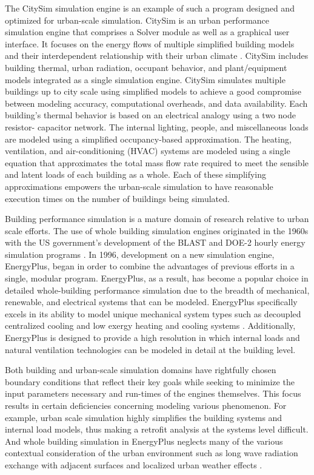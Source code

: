 \documentclass{tBPS2e}
\theoremstyle{plain}
\theoremstyle{definition}
\theoremstyle{remark}
\newcommand{\noteDT}[1]{\footnote{\textcolor{green}{#1}}}
\begin{document}
The CitySim simulation engine is an example of such a program designed and
optimized for urban-scale simulation. CitySim is an urban performance
simulation engine that comprises a Solver module as well as a graphical user
interface. It focuses on the energy flows of multiple simplified building
models and their interdependent relationship with their urban climate
\citep{Robinson:2009tm}. CitySim includes building thermal, urban radiation,
occupant behavior, and plant/equipment models integrated as a single
simulation engine. CitySim simulates multiple buildings up to city scale using
simplified models to achieve a good compromise between modeling
accuracy, computational overheads, and data availability. Each building's
thermal behavior is based on an electrical analogy using a two node resistor-
capacitor network. The internal lighting, people, and miscellaneous loads are
modeled using a simplified occupancy-based approximation. The heating,
ventilation, and air-conditioning (HVAC) systems are modeled using a single
equation that approximates the total mass flow rate required to meet the
sensible and latent loads of each building as a whole. Each of these
simplifying approximations empowers the urban-scale simulation to have
reasonable execution times on the number of buildings being
simulated.

Building performance simulation is a mature domain of research relative to
urban scale efforts. The use of whole building simulation engines originated
in the 1960s with the US government's development of the BLAST and DOE-2
hourly energy simulation programs \citep{Lawrie:2001vf}. In 1996, development
on a new simulation engine, EnergyPlus, began in order to combine the
advantages of previous efforts in a single, modular program. EnergyPlus, as a
result, has become a popular choice in detailed whole-building performance
simulation due to the breadth of mechanical, renewable, and electrical systems
that can be modeled. EnergyPlus specifically excels in its ability to model
unique mechanical system types such as decoupled centralized cooling
\citep{Miller:2010wa} and low exergy heating and cooling systems
\citep{barbara:2015tz}. Additionally, EnergyPlus is designed to provide a high
resolution in which internal loads and natural ventilation technologies can be
modeled in detail at the building level.

Both building and urban-scale simulation domains have rightfully chosen
boundary conditions that reflect their key goals while seeking to minimize the
input parameters necessary and run-times of the engines themselves. This focus
results in certain deficiencies concerning modeling various phenomenon.
For example, urban scale simulation highly simplifies the building systems and
internal load models, thus making a retrofit analysis at the systems level
difficult. And whole building simulation in EnergyPlus neglects many of the
various contextual consideration of the urban environment such as long wave
radiation exchange with adjacent surfaces and localized urban weather effects
\citep{Lawrie:2001vf}.%
\end{document}
